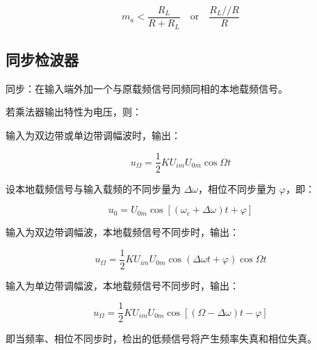 \begin{equation}
    m_a < \frac{R_L}{R + R_L} \quad \text{or} \quad \frac{R_L // R}{R}
\end{equation}

\subsection{同步检波器}

同步：在输入端外加一个与原载频信号同频同相的本地载频信号。

若乘法器输出特性为电压，则：

输入为双边带或单边带调幅波时，输出：

\begin{equation}
    u_{\Omega} = \frac{1}{2} K U_{im} U_{0m} \cos{\Omega t}
\end{equation}

设本地载频信号与输入载频的不同步量为 $\Delta \omega$，相位不同步量为 $\varphi$，即：

\begin{equation}
    u_0 = U_{0m} \cos{[(\omega_c + \Delta \omega)t + \varphi]}
\end{equation}

输入为双边带调幅波，本地载频信号不同步时，输出：

\begin{equation}
    u_{\Omega} = \frac{1}{2} K U_{im} U_{0m} \cos{(\Delta \omega t + \varphi)} \cos{\Omega t}
\end{equation}

输入为单边带调幅波，本地载频信号不同步时，输出：

\begin{equation}
    u_{\Omega} = \frac{1}{2} K U_{im} U_{0m} \cos{\left[(\Omega - \Delta \omega)t - \varphi\right]}
\end{equation}

即当频率、相位不同步时，检出的低频信号将产生频率失真和相位失真。

